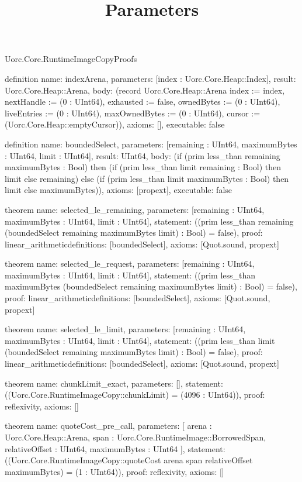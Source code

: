 \begin{lexlean}{Uorc.Core.RuntimeImageCopyProofs}
\title{Parameters}
\begin{semanticmodule}
definition{
  name: indexArena,
  parameters: [index : Uorc.Core.Heap::Index],
  result: Uorc.Core.Heap::Arena,
  body: (record Uorc.Core.Heap::Arena {index := index, nextHandle := (0 : UInt64), exhausted := false, ownedBytes := (0 : UInt64), liveEntries := (0 : UInt64), maxOwnedBytes := (0 : UInt64), cursor := (Uorc.Core.Heap::emptyCursor)}),
  axioms: [],
  executable: false
}

definition{
  name: boundedSelect,
  parameters: [remaining : UInt64, maximumBytes : UInt64, limit : UInt64],
  result: UInt64,
  body: (if (prim less_than remaining maximumBytes : Bool) then (if (prim less_than limit remaining : Bool) then limit else remaining) else (if (prim less_than limit maximumBytes : Bool) then limit else maximumBytes)),
  axioms: [propext],
  executable: false
}

theorem{
  name: selected_le_remaining,
  parameters: [remaining : UInt64, maximumBytes : UInt64, limit : UInt64],
  statement: ((prim less_than remaining (boundedSelect remaining maximumBytes limit) : Bool) = false),
  proof: linear_arithmetic{definitions: [boundedSelect]},
  axioms: [Quot.sound, propext]
}

theorem{
  name: selected_le_request,
  parameters: [remaining : UInt64, maximumBytes : UInt64, limit : UInt64],
  statement: ((prim less_than maximumBytes (boundedSelect remaining maximumBytes limit) : Bool) = false),
  proof: linear_arithmetic{definitions: [boundedSelect]},
  axioms: [Quot.sound, propext]
}

theorem{
  name: selected_le_limit,
  parameters: [remaining : UInt64, maximumBytes : UInt64, limit : UInt64],
  statement: ((prim less_than limit (boundedSelect remaining maximumBytes limit) : Bool) = false),
  proof: linear_arithmetic{definitions: [boundedSelect]},
  axioms: [Quot.sound, propext]
}

theorem{
  name: chunkLimit_exact,
  parameters: [],
  statement: ((Uorc.Core.RuntimeImageCopy::chunkLimit) = (4096 : UInt64)),
  proof: reflexivity{},
  axioms: []
}

theorem{
  name: quoteCost_pre_call,
  parameters: [
    arena : Uorc.Core.Heap::Arena,
    span : Uorc.Core.RuntimeImage::BorrowedSpan,
    relativeOffset : UInt64,
    maximumBytes : UInt64
  ],
  statement: ((Uorc.Core.RuntimeImageCopy::quoteCost arena span relativeOffset maximumBytes) = (1 : UInt64)),
  proof: reflexivity{},
  axioms: []
}


\end{semanticmodule}
\end{lexlean}
